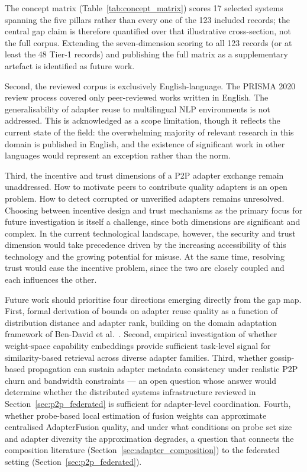 The concept matrix (Table~\ref{tab:concept_matrix}) scores 17 selected systems
spanning the five pillars rather than every one of the 123 included records; the
central gap claim is therefore quantified over that illustrative cross-section,
not the full corpus. Extending the seven-dimension scoring to all 123 records
(or at least the 48 Tier-1 records) and publishing the full matrix as a
supplementary artefact is identified as future work.

Second, the reviewed corpus is exclusively English-language. The PRISMA 2020 
review process covered only peer-reviewed works written in English. The 
generalisability of adapter reuse to multilingual NLP environments is not 
addressed. This is acknowledged as a scope limitation, though it reflects 
the current state of the field: the overwhelming majority of relevant 
research in this domain is published in English, and the existence of 
significant work in other languages would represent an exception rather 
than the norm.

Third, the incentive and trust dimensions of a P2P adapter exchange remain
unaddressed. How to motivate peers to contribute quality adapters is an 
open problem. How to detect corrupted or unverified adapters remains 
unresolved. Choosing between incentive design and trust mechanisms as the 
primary focus for future investigation is itself a challenge, since both 
dimensions are significant and complex. In the current technological 
landscape, however, the security and trust dimension would take precedence driven by the increasing accessibility of this technology and the 
growing potential for misuse. At the same time, resolving trust would 
ease the incentive problem, since the two are closely coupled and each 
influences the other.

Future work should prioritise four directions emerging directly from the gap
map. First, formal derivation of bounds on adapter reuse quality as a function 
of distribution distance and adapter rank, building on the domain adaptation 
framework of Ben-David et al.~\cite{BenDavid2010}. Second, empirical investigation of whether weight-space capability embeddings provide sufficient task-level signal for similarity-based retrieval across diverse adapter families.
Third, whether gossip-based propagation can sustain adapter metadata consistency under realistic P2P churn and bandwidth constraints — an open question whose answer would determine whether the distributed systems infrastructure reviewed in Section~\ref{sec:p2p_federated} is sufficient for adapter-level coordination. Fourth, whether probe-based local estimation of fusion weights can approximate centralised AdapterFusion quality, and under what conditions on probe set size and adapter diversity the approximation degrades, a question that connects the composition literature (Section~\ref{sec:adapter_composition}) to the federated setting (Section~\ref{sec:p2p_federated}).